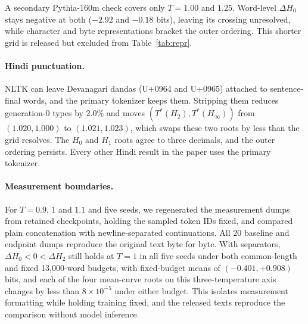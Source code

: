 \documentclass[10pt]{article}
\theoremstyle{plain}
\theoremstyle{definition}
\newcommand{\Htwo}{H_2}
\newcommand{\Hz}{H_0}
\newcommand{\Hinf}{H_\infty}
\begin{document}
A secondary Pythia-160m check covers only $T=1.00$ and $1.25$. Word-level $\Delta H_0$ stays
negative at both ($-2.92$ and $-0.18$ bits), leaving its crossing unresolved, while character and
byte representations bracket the outer ordering. This shorter grid is released but excluded from
Table~\ref{tab:repr}.

\paragraph{Hindi punctuation.} NLTK can leave Devanagari dandas (U+0964 and U+0965) attached to
sentence-final words, and the primary tokenizer keeps them. Stripping them reduces generation-0
types by 2.0\% and moves $(T^\ast(\Htwo),T^\ast(\Hinf))$ from $(1.020,1.000)$ to
$(1.021,1.023)$, which swaps these two roots by less than the grid resolves. The $\Hz$ and $H_1$
roots agree to three decimals, and the outer ordering persists. Every other Hindi result in the paper uses the primary tokenizer.

\paragraph{Measurement boundaries.} For $T=0.9$, $1$ and $1.1$ and five seeds, we regenerated the
measurement dumps from retained checkpoints, holding the sampled token IDs fixed, and compared
plain concatenation with newline-separated continuations. All 20 baseline and endpoint dumps
reproduce the original text byte for byte. With separators, $\Delta H_0<0<\Delta H_2$ still holds
at $T=1$ in all five seeds under both common-length and fixed 13,000-word budgets, with fixed-budget
means of $(-0.401,+0.908)$ bits, and each of the four mean-curve roots on this three-temperature
axis changes by less than $8\times10^{-5}$ under either budget. This isolates measurement
formatting while holding training fixed, and the released texts reproduce the comparison without
model inference.
\end{document}

